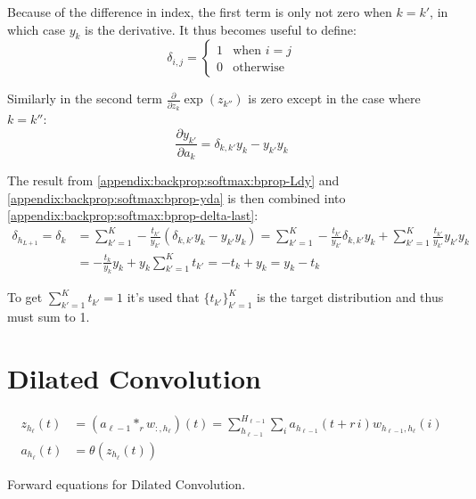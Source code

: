 Because of the difference in index, the first term is only not zero when $k = k'$, in which case $y_k$ is the derivative. It thus becomes useful to define:
\begin{equation}
\delta_{i,j} = \begin{cases}1& \text{when } i = j \\ 0 & \text{otherwise}\end{cases}
\end{equation}

Similarly in the second term $\frac{\partial}{\partial z_k} \exp(z_{k''})$ is zero except in the case where $k = k''$:
\begin{equation}
\frac{\partial y_{k'}}{\partial a_k} = \delta_{k, k'} y_k - y_{k'} y_k
\label{appendix:backprop:softmax:bprop-yda}
\end{equation}

The result from \eqref{appendix:backprop:softmax:bprop-Ldy} and \eqref{appendix:backprop:softmax:bprop-yda} is then combined into \eqref{appendix:backprop:softmax:bprop-delta-last}:
\begin{equation}
\begin{aligned}
\delta_{h_{L + 1}} = \delta_k &= \sum_{k'=1}^K -\frac{t_{k'}}{y_{k'}} \left( \delta_{k, k'} y_k - y_{k'} y_k \right) = \sum_{k'=1}^K -\frac{t_{k'}}{y_{k'}} \delta_{k, k'} y_k + \sum_{k'=1}^K \frac{t_{k'}}{y_{k'}} y_{k'} y_k \\
&= -\frac{t_k}{y_k} y_k + y_k \sum_{k'=1}^K t_{k'} = -t_k + y_k = y_k - t_k
\end{aligned}
\label{appendix:backprop:softmax:bprop-deltaKfinal}
\end{equation}

To get $\sum_{k'=1}^K t_{k'} = 1$ it's used that $\{ t_{k'} \}_{k'=1}^K$ is the target distribution and thus must sum to 1.

\section{Dilated Convolution}
\label{appendix:backward-pass:dilated-convolution}

\begin{equationbox}[H]
\begin{equation*}
\begin{aligned}
z_{h_\ell}(t) &= (a_{\ell-1} *_r w_{:, h_\ell})(t) = \sum_{h_{\ell-1}}^{H_{\ell-1}} \sum_{i} a_{h_{\ell-1}}(t + r\,i) w_{h_{\ell-1}, h_\ell}(i) \\
a_{h_\ell}(t) &= \theta(z_{h_\ell}(t))
\end{aligned}
\end{equation*}
\caption{Forward equations for Dilated Convolution.}
\end{equationbox}

